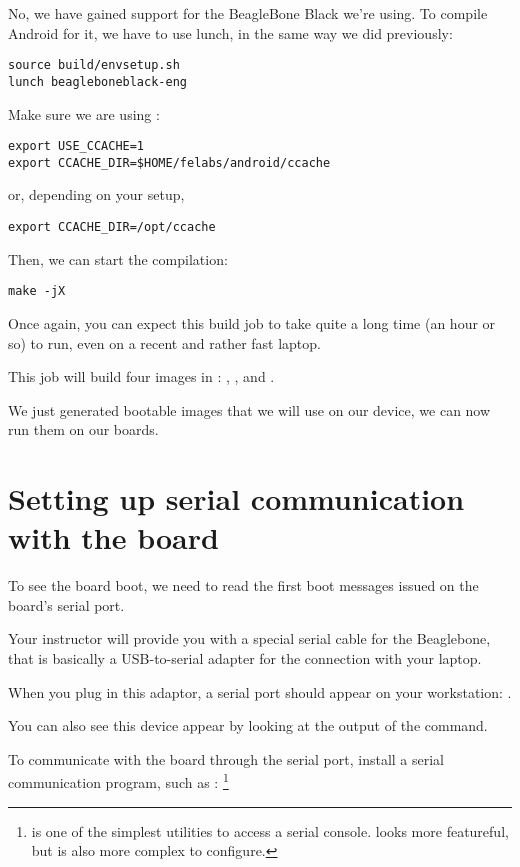 No, we have gained support for the BeagleBone Black we're using. To
compile Android for it, we have to use lunch, in the same way we did
previously:

\begin{verbatim}
source build/envsetup.sh
lunch beagleboneblack-eng
\end{verbatim}

Make sure we are using :

\begin{verbatim}
export USE_CCACHE=1
export CCACHE_DIR=$HOME/felabs/android/ccache
\end{verbatim}
or, depending on your setup,
\begin{verbatim}
export CCACHE_DIR=/opt/ccache
\end{verbatim}

Then, we can start the compilation:

\begin{verbatim}
make -jX
\end{verbatim}

Once again, you can expect this build job to take quite a long time
(an hour or so) to run, even on a recent and rather fast laptop.

This job will build four images in
: ,
 ,  and
.

We just generated bootable images that we will use on our device, we
can now run them on our boards.

\section{Setting up serial communication with the board}

To see the board boot, we need to read the first boot messages issued
on the board's serial port.

Your instructor will provide you with a special serial cable for the
Beaglebone, that is basically a USB-to-serial adapter for the
connection with your laptop.

When you plug in this adaptor, a serial port should appear on your
workstation: .

You can also see this device appear by looking at the output of the
 command.

To communicate with the board through the serial port, install a
serial communication program, such as :
\footnote{ is one of the simplest utilities to access a
  serial console.  looks more featureful, but is also
  more complex to configure.}

